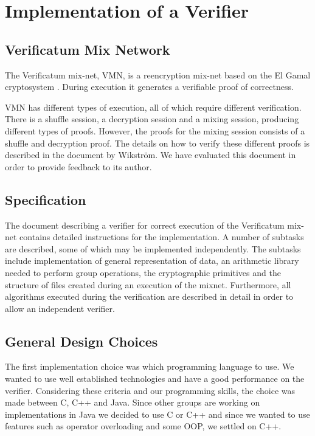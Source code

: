 \section{Implementation of a Verifier}

\subsection{Verificatum Mix Network}

The Verificatum mix-net, VMN, is a reencryption mix-net based on the
El Gamal cryptosystem \cite[p.~1]{wikstrom1}. During execution it
generates a verifiable proof of correctness. 

VMN has different types of execution, all of which require different
verification. There is a shuffle session, a decryption session and a
mixing session, producing different types of proofs. However, the
proofs for the mixing session consists of a shuffle and decryption
proof. The details on how to verify these different proofs is
described in the document \cite{wikstrom1} by Wikström. We have
evaluated this document in order to provide feedback to its author.

\subsection{Specification}

The document \cite{wikstrom1} describing a verifier for correct
execution of the Verificatum mix-net contains detailed instructions
for the implementation. A number of subtasks are described, some of
which may be implemented independently. The subtasks include
implementation of general representation of data, an arithmetic
library needed to perform group operations, the cryptographic
primitives and the structure of files created during an execution of
the mixnet. Furthermore, all algorithms executed during the
verification are described in detail in order to allow an independent
verifier.

\subsection{General Design Choices}

The first implementation choice was which programming language to
use. We wanted to use well established technologies and have a good
performance on the verifier. Considering these criteria and our
programming skills, the choice was made between C, C++ and Java. Since
other groups are working on implementations in Java we decided to use
C or C++ and since we wanted to use features such as operator
overloading and some OOP, we settled on C++.

